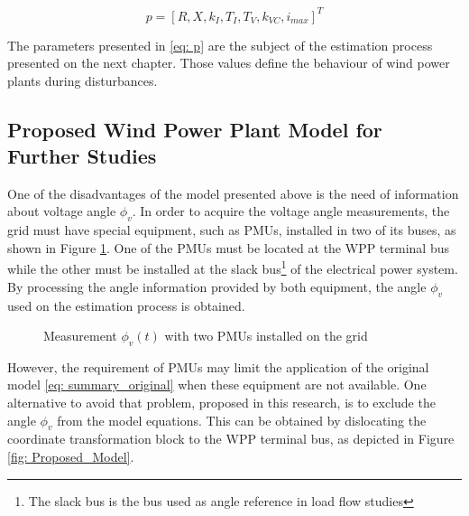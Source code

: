\begin{equation}
	p = [R, X, k_{I}, T_{I}, T_{V}, k_{VC}, i_{max}]^T
	\label{eq: p}
\end{equation}

The parameters presented in \eqref{eq: p} are the subject of the estimation process presented on the next chapter. Those values define the behaviour of wind power plants during disturbances.

\subsection{Proposed Wind Power Plant Model for Further Studies}

One of the disadvantages of the model presented above is the need of information about voltage angle $\phi_{v}$. In order to acquire the voltage angle measurements, the grid must have special equipment, such as PMUs, installed in two of its buses, as shown in Figure \ref{fig: PMU_grid}. One of the PMUs must be located at the WPP terminal bus while the other must be installed at the slack bus\footnote{The slack bus is the bus used as angle reference in load flow studies} of the electrical power system. By processing the angle information provided by both equipment, the angle $\phi_{v}$ used on the estimation process is obtained.

\begin{figure}[h]
	\caption{Measurement $\phi_{v}(t)$ with two PMUs installed on the grid}
	\begin{center}
	\end{center}
	\label{fig: PMU_grid}
\end{figure}

However, the requirement of PMUs may limit the application of the original model \eqref{eq: summary_original} when these equipment are not available. One alternative to avoid that problem, proposed in this research, is to exclude the angle $\phi_{v}$ from the model equations. This can be obtained by dislocating the coordinate transformation block to the WPP terminal bus, as depicted in Figure \ref{fig: Proposed_Model}.

